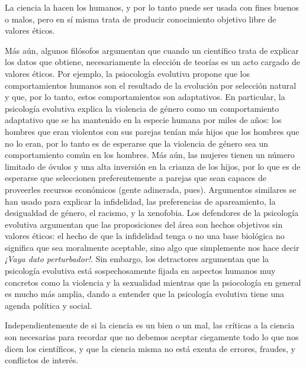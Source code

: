 \begin{remember}
	\label{rem:cienciabienomal}
	La ciencia la hacen los humanos, y por lo tanto puede ser usada con fines
	buenos o malos, pero en sí misma trata de producir conocimiento objetivo
	libre de valores éticos.
\end{remember}

Más aún, algunos filósofos argumentan que cuando un científico trata de explicar los datos que obtiene, necesariamente la elección de teorías es un acto cargado de valores éticos.
Por ejemplo, la psiocología evolutiva propone que los comportamientos humanos son el resultado de la evolución por selección natural y que, por lo tanto, estos comportamientos son adaptativos.
En particular, la psicología evolutiva explica la violencia de género como un comportamiento adaptativo que se ha mantenido en la especie humana por miles de años: los hombres que eran violentos con sus parejas tenían más hijos que los hombres que no lo eran, por lo tanto es de esperarse que la violencia de género sea un comportamiento común en los hombres.
Más aún, las mujeres tienen un número limitado de óvulos y una alta inversión en la crianza de los hijos, por lo que es de esperarse que seleccionen preferentemente a parejas que sean capaces de proveerles recursos económicos (gente adinerada, pues).
Argumentos similares se han usado para explicar la infidelidad, las preferencias de apareamiento, la desigualdad de género, el racismo, y la xenofobia.
Los defendores de la psicología evolutiva argumentan que las proposiciones del área son hechos objetivos sin valores éticos: el hecho de que la infidelidad tenga o no una base biológica no significa que sea moralmente aceptable, sino algo que simplemente nos hace decir \emph{¡Vaya dato perturbador!}.
Sin embargo, los detractores argumentan que la psicología evolutiva está sospechosamente fijada en aspectos humanos muy concretos como la violencia y la sexualidad mientras que la psiocología en general es mucho más amplia, dando a entender que la psicología evolutiva tiene una agenda política y social.

Independientemente de si la ciencia es un bien o un mal, las críticas a la ciencia son necesarias para recordar que no debemos aceptar ciegamente todo lo que nos dicen los científicos, y que la ciencia misma no está exenta de errores, fraudes, y conflictos de interés.
